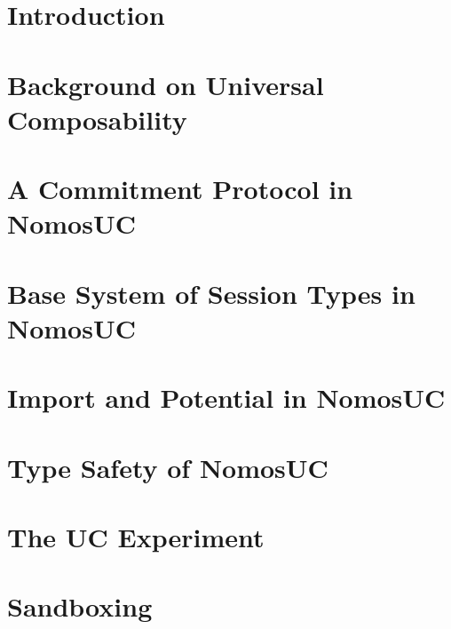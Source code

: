 \documentclass[conference]{IEEEtran}
\begin{document}

\section{Introduction} \label{sec:intro}


\section{Background on Universal Composability} \label{sec:background}


\section{A Commitment Protocol in NomosUC} \label{sec:example}


\section{Base System of Session Types in NomosUC} \label{sec:basic}


\section{Import and Potential in NomosUC} \label{sec:import}


\section{Type Safety of NomosUC} \label{sec:safety}


\section{The UC Experiment} \label{sec:execuc}


\section{Sandboxing}
 \label{sec:commitment}
%
%
\end{document}
